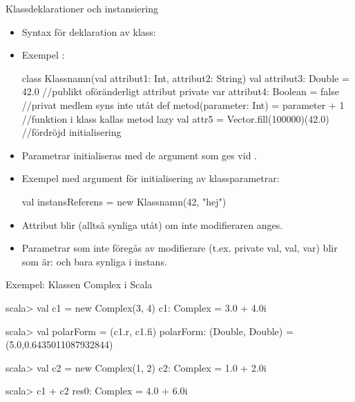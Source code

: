 \begin{Slide}{Klassdeklarationer och instansiering}\SlideFontSmall
\setlength{\leftmargini}{0pt}
\begin{itemize}
\item Syntax för deklaration av klass: \\ \vspace{0.5em}



\item Exempel :
\begin{Code}
class Klassnamn(val attribut1: Int, attribut2: String){
  val attribut3: Double = 42.0              //publikt oföränderligt attribut
  private var attribut4: Boolean = false    //privat medlem syns inte utåt
  def metod(parameter: Int) = parameter + 1 //funktion i klass kallas metod
  lazy val attr5 = Vector.fill(100000)(42.0)     //fördröjd initialisering
}
\end{Code}

\item Parametrar initialiseras med de argument som ges vid .
\item Exempel  med argument för initialisering av klassparametrar:
\begin{Code}
val instansReferens = new Klassnamn(42, "hej")
\end{Code}

\item Attribut blir  (alltså synliga utåt) om inte modifieraren  anges.
\item Parametrar som inte föregås av modifierare (t.ex. private val, val, var) blir  som är:  och bara synliga i  instans.

\end{itemize}
\end{Slide}






\begin{Slide}{Exempel: Klassen Complex i Scala}\SlideFontSmall
{}

\begin{REPL}
scala> val c1 = new Complex(3, 4)
c1: Complex = 3.0 + 4.0i

scala> val polarForm = (c1.r, c1.fi)
polarForm: (Double, Double) = (5.0,0.6435011087932844)

scala> val c2 = new Complex(1, 2)
c2: Complex = 1.0 + 2.0i

scala> c1 + c2
res0: Complex = 4.0 + 6.0i
\end{REPL}
\end{Slide}



